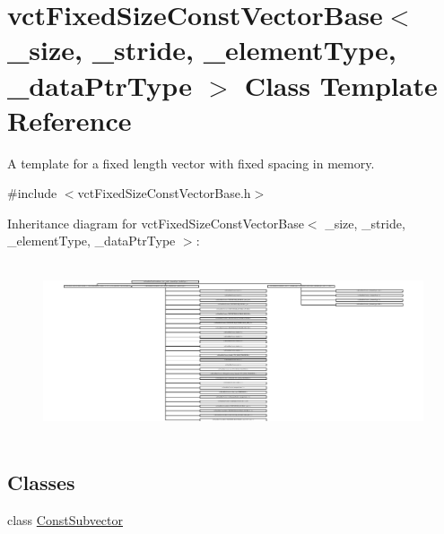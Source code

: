 \hypertarget{classvct_fixed_size_const_vector_base}{}\section{vct\+Fixed\+Size\+Const\+Vector\+Base$<$ \+\_\+size, \+\_\+stride, \+\_\+element\+Type, \+\_\+data\+Ptr\+Type $>$ Class Template Reference}
\label{classvct_fixed_size_const_vector_base}


A template for a fixed length vector with fixed spacing in memory.  




{\ttfamily \#include $<$vct\+Fixed\+Size\+Const\+Vector\+Base.\+h$>$}

Inheritance diagram for vct\+Fixed\+Size\+Const\+Vector\+Base$<$ \+\_\+size, \+\_\+stride, \+\_\+element\+Type, \+\_\+data\+Ptr\+Type $>$\+:\begin{figure}[H]
\begin{center}
\leavevmode
\includegraphics[height=5.213213cm]{d3/dde/classvct_fixed_size_const_vector_base}
\end{center}
\end{figure}
\subsection*{Classes}
\begin{DoxyCompactItemize}
\item 
class \hyperlink{classvct_fixed_size_const_vector_base_1_1_const_subvector}{Const\+Subvector}
\end{DoxyCompactItemize}
